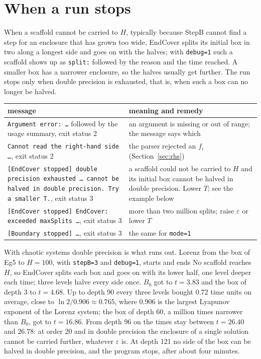 \documentclass[11pt,a4paper]{article}
\newcommand{\out}[2][]{\VerbatimInput[fontsize=\footnotesize,#1]{#2}}
\newcommand{\eps}{\varepsilon}
\begin{document}
\section{When a run stops}\label{sec:fail}

When a scaffold cannot be carried to $H$, typically because StepB cannot find
a step for an enclosure that has grown too wide, EndCover splits its initial
box in two along a longest side and goes on with the halves; with
\texttt{debug=1} such a scaffold shows up as \texttt{split:} followed by the
reason and the time reached. A smaller box has a narrower enclosure, so the
halves usually get further. The run stops only when double precision is
exhausted, that is, when such a box can no longer be halved.

\begin{center}\small
\begin{tabular}{p{}p{}}
\toprule
message & meaning and remedy \\
\midrule
\texttt{Argument error: \dots} followed by the usage summary, exit status 2 &
  an argument is missing or out of range; the message says which \\
\texttt{Cannot read the right-hand side \dots}, exit status 2 &
  the parser rejected an $f_i$ (Section~\ref{sec:rhs}) \\
\texttt{[EndCover stopped] double precision exhausted \dots\ cannot be
  halved in double precision. Try a smaller T.}, exit status 3 &
  a scaffold could not be carried to $H$ and its initial box cannot be
  halved in double precision. Lower $T$; see the example below \\
\texttt{[EndCover stopped] EndCover: exceeded maxSplits \dots}, exit status 3 &
  more than two million splits; raise $\eps$ or lower $T$ \\
\texttt{[Boundary stopped] \dots}, exit status 3 &
  the same for \texttt{mode=1} \\
\bottomrule
\end{tabular}
\end{center}

With chaotic systems double precision is what runs out. Lorenz from the box
of Eg5 to $H = 100$, with \texttt{stepB=3} and \texttt{debug=1}, starts
\out[lastline=8]{out/lorenz_T100.txt}
and ends
\out[firstline=124]{out/lorenz_T100.txt}
No scaffold reaches $H$, so EndCover splits each box and goes on with its
lower half, one level deeper each time; three levels halve every side once.
$B_0$ got to $t = 3.83$ and the box of depth 3 to $t = 4.68$. Up to depth 90
every three levels bought 0.72 time units on average, close to
$\ln 2 / 0.906 \approx 0.765$, where $0.906$ is the largest Lyapunov exponent
of the Lorenz system; the box of depth 60, a million times narrower than
$B_0$, got to $t = 16.86$. From depth 96 on the times stay between
$t = 26.40$ and $26.78$: at order 20 and in double precision the enclosure of
a single solution cannot be carried further, whatever $\eps$ is. At depth 121
no side of the box can be halved in double precision, and the program stops,
after about four minutes.
\end{document}

